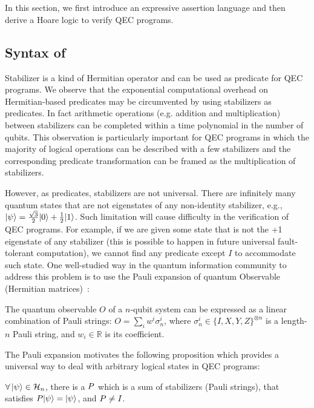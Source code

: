 \section{{\assnname}}
In this section, 
we first introduce an expressive assertion language \textbf{\assnname} and then derive a Hoare logic to verify QEC programs.
\subsection{Syntax of \assnname}

Stabilizer is a kind of Hermitian operator and can be used  as predicate for QEC programs. 
We observe that  the exponential computational overhead on Hermitian-based predicates may be circumvented by using stabilizers as predicates. In fact arithmetic operations (e.g. addition and multiplication) between stabilizers can be completed within a time polynomial in the number of qubits.
This observation is particularly important for QEC programs in which the majority of logical operations can be described with a few stabilizers and the corresponding predicate transformation can be framed as the multiplication of stabilizers.

However, as predicates, stabilizers are not universal.
There are infinitely many quantum states that are not eigenstates of any non-identity stabilizer, e.g., $\vert \psi \rangle = \frac{\sqrt{3}}{2}\vert 0 \rangle + \frac{1}{2}\vert 1 \rangle$. 
Such limitation will cause difficulty in the verification of QEC programs. For example, if we are given some state that is not the +1 eigenstate of any stabilizer (this is possible to happen in future universal fault-tolerant computation), we cannot find any predicate except $I$ to accommodate such state.%
One well-studied way in the quantum information community to address this problem is to use the Pauli expansion of quantum Observable (Hermitian matrices)~\cite{nielsen2002quantum,Wilde2013QuantumIT}: \nothmskip
\begin{lemma}\label{lem:pauli-expansion}
The quantum observable $O$ of a $n$-qubit system can be expressed as a linear combination of Pauli strings:
   $ O = \sum_i w^i\sigma^i_n$,
where $\sigma_n^i \in \{I, X, Y, Z\}^{\otimes n}$ is a length-$n$ Pauli string, and $w_i \in \mathbb{R}$ is its coefficient.
\nothmskip
\end{lemma}

The Pauli expansion motivates the following proposition which provides a universal way to deal with arbitrary logical states in QEC programs: 
\nothmskip
\begin{proposition}\label{prop:universal-stabilizer}
$\forall\, \vert \psi \rangle \in \mathcal{H}_n$, there is a $P$ which is a sum of stabilizers (Pauli strings), that satisfies $P \vert \psi \rangle = \vert \psi \rangle$, and $P \ne I$.
\nothmskip
\end{proposition}

